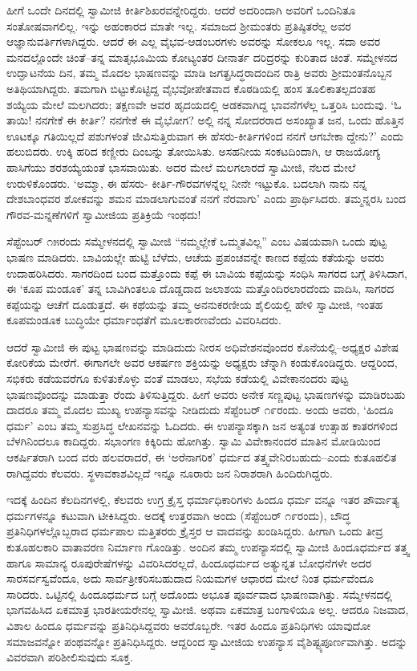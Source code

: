 ಹೀಗೆ ಒಂದೇ ದಿನದಲ್ಲಿ ಸ್ವಾಮೀಜಿ ಕೀರ್ತಿಶಿಖರವನ್ನೇರಿದ್ದರು. ಆದರೆ ಅದರಿಂದಾಗಿ ಅವರಿಗೆ ಒಂದಿನಿತೂ ಸಂತೋಷವಾಗಲಿಲ್ಲ. ಇನ್ನು ಅಹಂಕಾರದ ಮಾತೇ ಇಲ್ಲ. ಸಮಾಜದ ಶ್ರೀಮಂತರು ಪ್ರತಿಷ್ಠಿತರೆಲ್ಲ ಅವರ ಆಜ್ಞಾನುವರ್ತಿಗಳಾಗಿದ್ದರು. ಆದರೆ ಈ ಎಲ್ಲ ವೈಭವ-ಆಡಂಬರಗಳು ಅವರನ್ನು ಸೋಕಲೂ ಇಲ್ಲ. ಸದಾ ಅವರ ಮನದಲ್ಲೊಂದೇ ಚಿಂತೆ–ತನ್ನ ಮಾತೃಭೂಮಿಯ ಕೋಟ್ಯಂತರ ದೀನಾರ್ತ ದರಿದ್ರರನ್ನು ಕುರಿತಾದ ಚಿಂತೆ. ಸಮ್ಮೇಳನದ ಉದ್ಘಾಟನೆಯ ದಿನ, ತಮ್ಮ ಮೊದಲ ಭಾಷಣವನ್ನು ಮಾಡಿ ಜಗತ್ಪ್ರಸಿದ್ಧರಾದಂದಿನ ರಾತ್ರಿ ಅವರು ಶ್ರೀಮಂತನೊಬ್ಬನ ಅತಿಥಿಯಾಗಿದ್ದರು. ತಮಗಾಗಿ ಬಿಟ್ಟುಕೊಟ್ಟಿದ್ದ ವೈಭವೋಪೇತವಾದ ಕೊಠಡಿಯಲ್ಲಿ ಹಂಸ ತೂಲಿಕಾತಲ್ಪದಂತಹ ಶಯ್ಯೆಯ ಮೇಲೆ ಮಲಗಿದರು; ತಕ್ಷಣವೇ ಅವರ ಹೃದಯದಲ್ಲಿ ಅಡಕವಾಗಿದ್ದ ಭಾವನೆಗಳೆಲ್ಲ ಒತ್ತರಿಸಿ ಬಂದುವು. ‘ಓ ತಾಯಿ! ನನಗೇಕೆ ಈ ಕೀರ್ತಿ? ನನಗೇಕೆ ಈ ವೈಭೋಗ? ಅಲ್ಲಿ ನನ್ನ ಸೋದರರಾದ ಅಸಂಖ್ಯಾತ ಜನ, ಒಂದು ಹೊತ್ತಿನ ಊಟಕ್ಕೂ ಗತಿಯಿಲ್ಲದೆ ಪಶುಗಳಂತೆ ಜೀವಿಸುತ್ತಿರುವಾಗ ಈ ಹೆಸರು-ಕೀರ್ತಿಗಳಿಂದ ನನಗೆ ಆಗಬೇಕಾ ದ್ದೇನು?’ ಎಂದು ಹಲುಬಿದರು. ಉಕ್ಕಿ ಹರಿದ ಕಣ್ಣೀರು ದಿಂಬನ್ನು ತೋಯಿಸಿತು. ಅಸಹನೀಯ ಸಂಕಟದಿಂದಾಗಿ, ಆ ರಾಜಯೋಗ್ಯ ಹಾಸಿಗೆಯು ಶರಶಯ್ಯೆಯಂತೆ ಭಾಸವಾಯಿತು. ಅದರ ಮೇಲೆ ಮಲಗಲಾರದೆ ಸ್ವಾಮೀಜಿ, ನೆಲದ ಮೇಲೆ ಉರುಳಿಕೊಂಡರು. ‘ಅಮ್ಮಾ, ಈ ಹೆಸರು- ಕೀರ್ತಿ-ಗೌರವಗಳನ್ನೆಲ್ಲ ನೀನೇ ಇಟ್ಟುಕೊ. ಬದಲಾಗಿ ನಾನು ನನ್ನ ದೇಶಬಾಂಧವರ ಶೋಕವನ್ನು ಶಮನ ಮಾಡಲಾಗುವಂತೆ ನನಗೆ ನೆರವಾಗು’ ಎಂದು ಪ್ರಾರ್ಥಿಸಿದರು. ತಮ್ಮನ್ನರಸಿ ಬಂದ ಗೌರವ-ಮನ್ನಣೆಗಳಿಗೆ ಸ್ವಾಮೀಜಿಯ ಪ್ರತಿಕ್ರಿಯೆ ಇಂಥದು!

ಸೆಪ್ಟೆಂಬರ್ ೧೫ರಂದು ಸಮ್ಮೇಳನದಲ್ಲಿ ಸ್ವಾಮೀಜಿ “ನಮ್ಮಲ್ಲೇಕೆ ಒಮ್ಮತವಿಲ್ಲ” ಎಂಬ ವಿಷಯವಾಗಿ ಒಂದು ಪುಟ್ಟ ಭಾಷಣ ಮಾಡಿದರು. ಬಾವಿಯಲ್ಲೇ ಹುಟ್ಟಿ ಬೆಳೆದು, ಆಚೆಯ ಪ್ರಪಂಚವನ್ನೇ ಕಾಣದ ಕಪ್ಪೆಯ ಕತೆಯನ್ನು ಅವರು ಉದಾಹರಿಸಿದರು. ಸಾಗರದಿಂದ ಬಂದ ಮತ್ತೊಂದು ಕಪ್ಪೆ ಈ ಬಾವಿಯ ಕಪ್ಪೆಯನ್ನು ಸಂಧಿಸಿ ಸಾಗರದ ಬಗ್ಗೆ ತಿಳಿಸಿದಾಗ, ಈ ‘ಕೂಪ ಮಂಡೂಕ’ ತನ್ನ ಬಾವಿಗಿಂತಲೂ ದೊಡ್ಡದಾದ ಜಲಾಶಯ ಮತ್ತೊಂದಿರಲಾರದೆಂದು ವಾದಿಸಿ, ಸಾಗರದ ಕಪ್ಪೆಯನ್ನು ಆಚೆಗೆ ದೂಡುತ್ತದೆ. ಈ ಕಥೆಯನ್ನು ತಮ್ಮ ಅನನುಕರಣೀಯ ಶೈಲಿಯಲ್ಲಿ ಹೇಳಿ ಸ್ವಾಮೀಜಿ, ಇಂತಹ ಕೂಪಮಂಡೂಕ ಬುದ್ಧಿಯೇ ಧರ್ಮಾಂಧತೆಗೆ ಮೂಲಕಾರಣವೆಂದು ವಿವರಿಸಿದರು.

ಆದರೆ ಸ್ವಾಮೀಜಿ ಈ ಪುಟ್ಟ ಭಾಷಣವನ್ನು ಮಾಡಿದುದು ನೀರಸ ಅಧಿವೇಶನವೊಂದರ ಕೊನೆಯಲ್ಲಿ–ಅಧ್ಯಕ್ಷರ ವಿಶೇಷ ಕೋರಿಕೆಯ ಮೇರೆಗೆ. ಈಗಾಗಲೇ ಅವರ ಆಕರ್ಷಣ ಶಕ್ತಿಯನ್ನು ಅಧ್ಯಕ್ಷರು ಚೆನ್ನಾಗಿ ಕಂಡುಕೊಂಡಿದ್ದರು. ಆದ್ದರಿಂದ, ಸಭಿಕರು ಕಡೆಯವರೆಗೂ ಕುಳಿತುಕೊಳ್ಳು ವಂತೆ ಮಾಡಲು, ಸಭೆಯ ಕಡೆಯಲ್ಲಿ ವಿವೇಕಾನಂದರು ಪುಟ್ಟ ಭಾಷಣವೊಂದನ್ನು ಮಾಡುತ್ತಾ ರೆಂದು ತಿಳಿಸುತ್ತಿದ್ದರು. ಹೀಗೆ ಅವರು ಅನೇಕ ಸಣ್ಣಪುಟ್ಟ ಭಾಷಣಗಳನ್ನು ಮಾಡಿರಬಹು ದಾದರೂ ತಮ್ಮ ಮೊದಲ ಮುಖ್ಯ ಉಪನ್ಯಾಸವನ್ನು ನೀಡಿದುದು ಸೆಪ್ಟೆಂಬರ್ ೧೯ರಂದು. ಅಂದು ಅವರು, ‘ಹಿಂದೂ ಧರ್ಮ’ ಎಂಬ ತಮ್ಮ ಸುಪ್ರಸಿದ್ಧ ಲೇಖನವನ್ನು ಓದಿದರು. ಈ ಉಪನ್ಯಾಸಕ್ಕಾಗಿ ಜನ ಅತ್ಯಂತ ಉತ್ಸಾಹ ಕಾತರಗಳಿಂದ ಬೆಳಗಿನಿಂದಲೂ ಕಾದಿದ್ದರು. ಸಭಾಂಗಣ ಕಿಕ್ಕಿರಿದು ಹೋಗಿತ್ತು. ಸ್ವಾಮಿ ವಿವೇಕಾನಂದರ ಮಾತಿನ ಮೋಡಿಯಿಂದ ಆಕರ್ಷಿತರಾಗಿ ಬಂದ ವರು ಹಲವರಾದರೆ, ಈ ‘ಅರೆನಾಗರಿಕ’ ಧರ್ಮದ ತತ್ತ್ವವೇನಿರಬಹುದು–ಎಂದು ಕುತೂಹಲಿತ ರಾಗಿದ್ದವರು ಕೆಲವರು. ಸ್ಥಳಾವಕಾಶವಿಲ್ಲದೆ ಇನ್ನೂ ನೂರಾರು ಜನ ನಿರಾಶರಾಗಿ ಹಿಂದಿರುಗಿದ್ದರು.

ಇದಕ್ಕೆ ಹಿಂದಿನ ಕೆಲದಿನಗಳಲ್ಲಿ, ಕೆಲವರು ಉಗ್ರ ಕ್ರೈಸ್ತ ಧರ್ಮಾಧಿಕಾರಿಗಳು ಹಿಂದೂ ಧರ್ಮ ವನ್ನೂ ಇತರ ಪೌರ್ವಾತ್ಯ ಧರ್ಮಗಳನ್ನೂ ಕಟುವಾಗಿ ಟೀಕಿಸಿದ್ದರು. ಅದಕ್ಕೆ ಉತ್ತರವಾಗಿ ಅಂದು (ಸೆಪ್ಟೆಂಬರ್ ೧೯ರಂದು), ಬೌದ್ಧ ಪ್ರತಿನಿಧಿಗಳಲ್ಲೊಬ್ಬರಾದ ಧರ್ಮಪಾಲ ಮತ್ತಿತರರು ಕ್ರೈಸ್ತರ ಆ ವಾದವನ್ನು ಖಂಡಿಸಿದ್ದರು. ಹೀಗಾಗಿ ಒಂದು ತೀವ್ರ ಕುತೂಹಲಕಾರಿ ವಾತಾವರಣ ನಿರ್ಮಾಣ ಗೊಂಡಿತ್ತು. ಅಂದಿನ ತಮ್ಮ ಉಪನ್ಯಾಸದಲ್ಲಿ ಸ್ವಾಮೀಜಿ ಹಿಂದೂಧರ್ಮದ ತತ್ತ್ವ ಹಾಗೂ ಸಾಮಾನ್ಯ ರೂಪುರೇಷೆಗಳನ್ನು ವಿವರಿಸಿದರಲ್ಲದೆ, ಹಿಂದೂಧರ್ಮದ ಅತ್ಯುನ್ನತ ಬೋಧನೆಗಳೇ ಅದರ ಸಾರಸರ್ವಸ್ವವೆಂದೂ, ಅದು ಸಾರ್ವತ್ರೀಕರಿಸಬಹುದಾದ ನಿಯಮಗಳ ಆಧಾರದ ಮೇಲೆ ನಿಂತ ಧರ್ಮವೆಂದೂ ಸಾರಿದರು. ಒಟ್ಟಿನಲ್ಲಿ ಹಿಂದೂಧರ್ಮದ ಬಗ್ಗೆ ಅದೊಂದು ಅಭೂತ ಪೂರ್ವವಾದ ಭಾಷಣವಾಗಿತ್ತು. ಸಮ್ಮೇಳನದಲ್ಲಿ ಭಾಗವಹಿಸಿದ ಏಕಮಾತ್ರ ಭಾರತೀಯರೇನಲ್ಲ ಸ್ವಾಮೀಜಿ. ಅಥವಾ ಏಕಮಾತ್ರ ಬಂಗಾಳಿಯೂ ಅಲ್ಲ. ಆದರೂ ನಿಜವಾದ, ವಿಶಾಲ ಹಿಂದೂ ಧರ್ಮವನ್ನು ಪ್ರತಿನಿಧಿಸಿದ್ದವರು ಅವರೊಬ್ಬರೇ. ಇತರ ಹಿಂದೂ ಪ್ರತಿನಿಧಿಗಳು ಯಾವುದೋ ಸಮಾಜವನ್ನೋ ಪಂಥವನ್ನೋ ಪ್ರತಿನಿಧಿಸಿದ್ದರು. ಆದ್ದರಿಂದ ಸ್ವಾಮೀಜಿಯ ಉಪನ್ಯಾಸ ವೈಶಿಷ್ಟ್ಯಪೂರ್ಣವಾಗಿತ್ತು. ಅದನ್ನು ವಿವರವಾಗಿ ಪರಿಶೀಲಿಸುವುದು ಸೂಕ್ತ.

